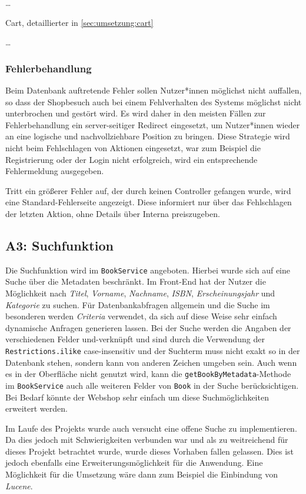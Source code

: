 		\dots
		
		Cart, detaillierter in \ref{sec:umsetzung:cart}
		
		\dots
		
		\subsubsection{Fehlerbehandlung}
		Beim Datenbank auftretende Fehler sollen Nutzer*innen möglichst nicht auffallen, so dass der Shopbesuch auch bei einem Fehlverhalten des Systems möglichst nicht unterbrochen und gestört wird. Es wird daher in den meisten Fällen zur Fehlerbehandlung ein server-seitiger Redirect eingesetzt, um Nutzer*innen wieder an eine logische und nachvollziehbare Position zu bringen. Diese Strategie wird nicht beim Fehlschlagen von Aktionen eingesetzt, war zum Beispiel die Registrierung oder der Login nicht erfolgreich, wird ein entsprechende Fehlermeldung ausgegeben.
		
		Tritt ein größerer Fehler auf, der durch keinen Controller gefangen wurde, wird eine Standard-Fehlerseite angezeigt. Diese informiert nur über das Fehlschlagen der letzten Aktion, ohne Details über Interna preiszugeben.

	\subsection{A3: Suchfunktion}\label{umsetzung:Suche}
	Die Suchfunktion wird im \texttt{BookService} angeboten. Hierbei wurde sich auf eine Suche über die Metadaten beschränkt. Im Front-End hat der Nutzer die Möglichkeit nach \textit{Titel}, \textit{Vorname}, \textit{Nachname}, \textit{ISBN}, \textit{Erscheinungsjahr} und \textit{Kategorie} zu suchen. Für Datenbankabfragen allgemein und die Suche im besonderen werden \textit{Criteria} verwendet, da sich auf diese Weise sehr einfach dynamische Anfragen generieren lassen. Bei der Suche werden die Angaben der verschiedenen Felder und-verknüpft und sind durch die Verwendung der \texttt{Restrictions.ilike} case-insensitiv und der Suchterm muss nicht exakt so in der Datenbank stehen, sondern kann von anderen Zeichen umgeben sein.
	Auch wenn es in der Oberfläche nicht genutzt wird, kann die \texttt{getBookByMetadata}-Methode im \texttt{BookService} auch alle weiteren Felder von \texttt{Book} in der Suche berücksichtigen. Bei Bedarf könnte der Webshop sehr einfach um diese Suchmöglichkeiten erweitert werden.
	
	Im Laufe des Projekts wurde auch versucht eine offene Suche zu implementieren. Da dies jedoch mit Schwierigkeiten verbunden war und als zu weitreichend für dieses Projekt betrachtet wurde, wurde dieses Vorhaben fallen gelassen. Dies ist jedoch ebenfalls eine Erweiterungsmöglichkeit für die Anwendung. Eine Möglichkeit für die Umsetzung wäre dann zum Beispiel die Einbindung von \textit{Lucene}.

